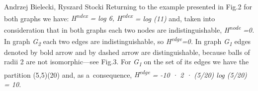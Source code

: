 \begin{artengenv2auth}{Andrzej Bielecki, Ryszard Stocki}
Returning to the example presented in Fig.2 for both graphs we have: \textit{H}\textit{\textsuperscript{ndex}} \textit{= log 6, H}\textit{\textsuperscript{edex}} \textit{= log (11)} and, taken into consideration that in both graphs each two nodes are indistinguishable, \textit{H}\textit{\textsuperscript{node}} \textit{=0.} In graph \textit{G}\textit{\textsubscript{2}} each two edges are indistinguishable, so \textit{H}\textit{\textsuperscript{edge}}\textit{=0.} In graph \textit{G}\textit{\textsubscript{1}} edges denoted by bold arrow and by dashed arrow are distinguishable, because balls of radii 2 are not isomorphic---see Fig.3. For \textit{G}\textit{\textsubscript{1}} on the set of its edges we have the partition (5,5)(20) and, as a~consequence, \textit{H}\textit{\textsuperscript{edge}} \textit{= -10 · 2 · (5/20) log (5/20) = 10.} 


\begin{figure}[htbp]
 \centering %


\end{figure}
\end{artengenv2auth}
